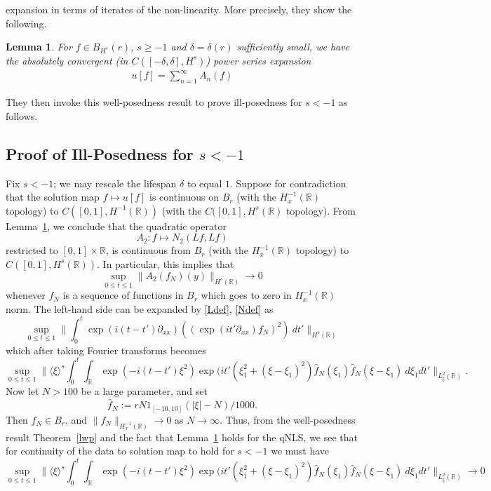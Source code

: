 \documentclass[12pt,reqno]{amsart}
\numberwithin{equation}{section}  %
\newcommand{\rr}{\mathbb{R}}
\newtheorem{lemma}[theorem]{Lemma}
\newcommand{\R}{\mathbb{R}}
\begin{document}
expansion in terms of iterates of the non-linearity. More precisely, they show
the following. 
%
\begin{lemma}
  \label{lem:qnls-asymp}
  For $f \in B_{H^{s}}(r)$, $s \ge -1$ and $\delta=\delta(r)$
sufficiently small, we have the absolutely convergent
(in $C([-\delta, \delta], H^{s})$) power series expansion
%
%
\begin{equation}
  \label{qnlspower-series-soln}
\begin{split}
  u[f] = \sum_{n=1}^{\infty} A_{n}(f)
\end{split}
\end{equation}
%
%
\end{lemma}
They then invoke this well-posedness result to prove ill-posedness for $s <
-1$ as follows.
%
%
%
%
\subsection{Proof of Ill-Posedness for $s < -1$} 
%
%
%
Fix $s < -1$; we may rescale the lifespan $\delta$ to equal $1$.  Suppose for contradiction
that the solution map $f \mapsto u[f]$ is continuous on $B_r$ (with the
$H^{-1}_x(\R)$ topology) to $C([0, 1], H^{-1}(\rr))$ 
(with the $C([0,1], H^{s}(\rr)$ topology). From 
Lemma~\ref{lem:qnls-asymp}, we conclude that the quadratic operator
$$ A_2: f \mapsto N_2(Lf, Lf)$$ 
restricted to $[0,1] \times \R$, is continuous from $B_r$ (with the $H^{-1}_x(\R)$ topology) 
to $C([0,1], H^{s}(\rr))$.  In particular, this implies that
$$ \sup_{0 \leq t\leq 1}\| A_2(f_N)(y) \|_{H^{s}(\R)} \to 0$$
whenever $f_N$ is a sequence of functions in $B_r$ which goes to zero in $H^{-1}_x(\R)$ norm.
The left-hand side can be expanded by \eqref{Ldef}, \eqref{Ndef} as
$$ \sup_{0 \leq t \leq 1} 
\| \int_0^t \exp(i(t-t')\partial_{xx})((\exp(it' \partial_{xx}) f_N)^2)\ dt' \|_{H^{s}(\R)}$$
which after taking Fourier transforms becomes
$$\sup_{0 \leq t \leq 1} 
\| \langle \xi \rangle^{s}
\int_0^t \int_\R \exp(-i(t-t')\xi^2) \exp(it' (\xi_1^2 + (\xi-\xi_1)^2) \hat f_N(\xi_1) \hat f_N(\xi-\xi_1)\ d\xi_1 dt'
\|_{L^2_\xi(\R)}.$$
Now let $N > 100$ be a large parameter, and set 
$$ \hat f_N := r N 1_{[-10,10]}(|\xi|-N) / 1000.$$
Then $f_N \in B_r$, and $\|f_N\|_{H^{-1}_x(\R)} \to 0$ as $N \to \infty$.  Thus,
from the well-posedness result Theorem~\ref{lwp} and the fact that
Lemma~\ref{lem:qnls-asymp}
holds for
the qNLS, we see that for continuity of the data to solution map to hold for $s < -1$ we must have
\begin{equation}\label{sin}
\sup_{0 \leq t \leq 1} \| \langle \xi \rangle^{s}
\int_0^t \int_\R \exp(-i(t-t')\xi^2) \exp(it' (\xi_1^2 + (\xi-\xi_1)^2) \hat f_N(\xi_1) \hat f_N(\xi-\xi_1)\ d\xi_1 dt'
\|_{L^2_\xi(\R)} \to 0
\end{equation}
\end{document}
